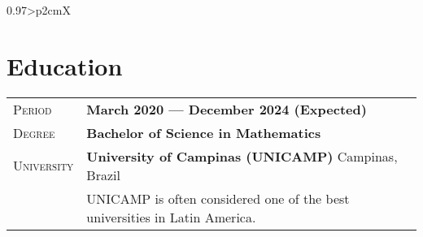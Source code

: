 \documentclass[a4paper, oneside, final]{scrartcl} %
\newcommand{\gray}{\rowcolor[gray]{.90}} %
\begin{document}
\begin{center}
\begin{tabularx}{0.97\linewidth}{>{\raggedleft\scshape}p{2cm}X}
\end{tabularx}



\section{Education}

\begin{tabularx}{0.97\linewidth}{>{\raggedleft\scshape}p{2cm}X}
\gray Period & \textbf{March 2020 --- December 2024 (Expected)}\\
\gray Degree & \textbf{Bachelor of Science in Mathematics}\\
\gray University & \textbf{University of Campinas (UNICAMP)} \hfill Campinas, Brazil\\
    & UNICAMP is often considered one of the best universities in Latin America.
\end{tabularx}

\vspace{10pt} %




\end{center}
\end{document}
